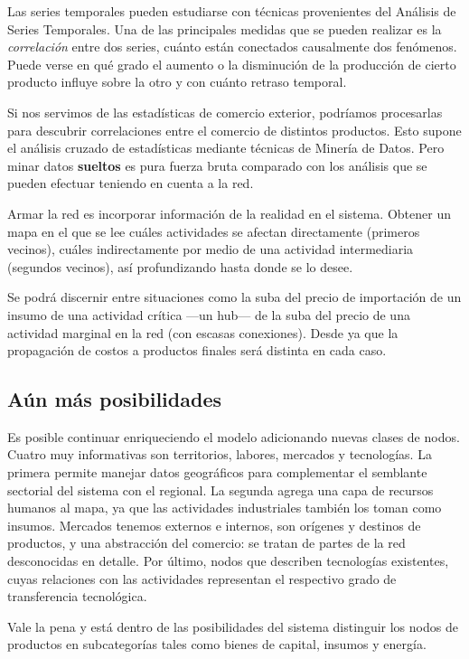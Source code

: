 \documentclass[a4paper]{report}
\begin{document}
Las series temporales pueden estudiarse con técnicas provenientes del Análisis de Series Temporales. Una de las principales medidas que se pueden realizar es la \textit{correlación} entre dos series, cuánto están conectados causalmente dos fenómenos. Puede verse en qué grado el aumento o la disminución de la producción de cierto producto influye sobre la otro y con cuánto retraso temporal.

Si nos servimos de las estadísticas de comercio exterior, podríamos procesarlas para descubrir correlaciones entre el comercio de distintos productos. Esto supone el análisis cruzado de estadísticas mediante técnicas de Minería de Datos. Pero minar datos \textbf{sueltos} es pura fuerza bruta comparado con los análisis que se pueden efectuar teniendo en cuenta a la red.

Armar la red es incorporar información de la realidad en el sistema. Obtener un mapa en el que se lee cuáles actividades se afectan directamente (primeros vecinos), cuáles indirectamente por medio de una actividad intermediaria (segundos vecinos), así profundizando hasta donde se lo desee.

Se podrá discernir entre situaciones como la suba del precio de importación de un insumo de una actividad crítica —un hub— de la suba del precio de una actividad marginal en la red (con escasas conexiones). Desde ya que la propagación de costos a productos finales será distinta en cada caso.

\subsection*{Aún más posibilidades}

Es posible continuar enriqueciendo el modelo adicionando nuevas clases de nodos. Cuatro muy informativas son territorios, labores, mercados y tecnologías. La primera permite manejar datos geográficos para complementar el semblante sectorial del sistema con el regional. La segunda agrega una capa de recursos humanos al mapa, ya que las actividades industriales también los toman como insumos. Mercados tenemos externos e internos, son orígenes y destinos de productos, y una abstracción del comercio: se tratan de partes de la red desconocidas en detalle. Por último, nodos que describen tecnologías existentes, cuyas relaciones con las actividades representan el respectivo grado de transferencia tecnológica.

Vale la pena y está dentro de las posibilidades del sistema distinguir los nodos de productos en subcategorías tales como bienes de capital, insumos y energía.
\end{document}
